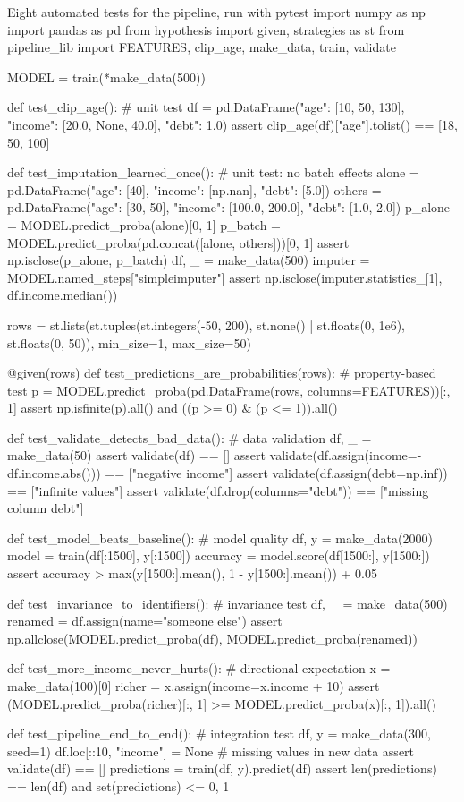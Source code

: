 \begin{pylisting}[label={lst:tests}]{Eight automated tests for the pipeline, run with pytest}
import numpy as np
import pandas as pd
from hypothesis import given, strategies as st
from pipeline_lib import FEATURES, clip_age, make_data, train, validate

MODEL = train(*make_data(500))

def test_clip_age():                                         # unit test
    df = pd.DataFrame({"age": [10, 50, 130], "income": [20.0, None, 40.0], "debt": 1.0})
    assert clip_age(df)["age"].tolist() == [18, 50, 100]

def test_imputation_learned_once():                         # unit test: no batch effects
    alone = pd.DataFrame({"age": [40], "income": [np.nan], "debt": [5.0]})
    others = pd.DataFrame({"age": [30, 50], "income": [100.0, 200.0],
                           "debt": [1.0, 2.0]})
    p_alone = MODEL.predict_proba(alone)[0, 1]
    p_batch = MODEL.predict_proba(pd.concat([alone, others]))[0, 1]
    assert np.isclose(p_alone, p_batch)
    df, _ = make_data(500)
    imputer = MODEL.named_steps["simpleimputer"]
    assert np.isclose(imputer.statistics_[1], df.income.median())

rows = st.lists(st.tuples(st.integers(-50, 200), st.none() | st.floats(0, 1e6),
                          st.floats(0, 50)), min_size=1, max_size=50)

@given(rows)
def test_predictions_are_probabilities(rows):               # property-based test
    p = MODEL.predict_proba(pd.DataFrame(rows, columns=FEATURES))[:, 1]
    assert np.isfinite(p).all() and ((p >= 0) & (p <= 1)).all()

def test_validate_detects_bad_data():                       # data validation
    df, _ = make_data(50)
    assert validate(df) == []
    assert validate(df.assign(income=-df.income.abs())) == ["negative income"]
    assert validate(df.assign(debt=np.inf)) == ["infinite values"]
    assert validate(df.drop(columns="debt")) == ["missing column debt"]

def test_model_beats_baseline():                            # model quality
    df, y = make_data(2000)
    model = train(df[:1500], y[:1500])
    accuracy = model.score(df[1500:], y[1500:])
    assert accuracy > max(y[1500:].mean(), 1 - y[1500:].mean()) + 0.05

def test_invariance_to_identifiers():                       # invariance test
    df, _ = make_data(500)
    renamed = df.assign(name="someone else")
    assert np.allclose(MODEL.predict_proba(df), MODEL.predict_proba(renamed))

def test_more_income_never_hurts():                         # directional expectation
    x = make_data(100)[0]
    richer = x.assign(income=x.income + 10)
    assert (MODEL.predict_proba(richer)[:, 1] >= MODEL.predict_proba(x)[:, 1]).all()

def test_pipeline_end_to_end():                             # integration test
    df, y = make_data(300, seed=1)
    df.loc[::10, "income"] = None                           # missing values in new data
    assert validate(df) == []
    predictions = train(df, y).predict(df)
    assert len(predictions) == len(df) and set(predictions) <= {0, 1}
\end{pylisting}
